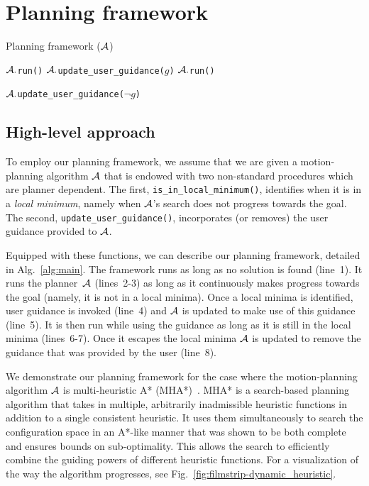 \documentclass[conference]{IEEEtran}
\begin{document}
\section{Planning framework}
\label{sec:planning}
\algrenewcommand\algorithmicindent{.8em}
\begin{algorithm}[tb]
\caption{Planning framework ($\mathcal{A}$)}
\label{alg:main}	
\begin{algorithmic}[1]
\small
{} 
		\State $\mathcal{A}.$\texttt{run()}
	\EndWhile
%	
	\State $\mathcal{A}.$\texttt{update\_user\_guidance($g$)}
		\State $\mathcal{A}.$\texttt{run()}
	\EndWhile

	\State $\mathcal{A}.$\texttt{update\_user\_guidance($\neg g$)}
\EndWhile
\end{algorithmic}
\end{algorithm}

\subsection{High-level approach}
\label{sec:high}
To employ our planning framework, we assume that we are given a motion-planning algorithm $\mathcal{A}$ that is endowed with two non-standard procedures which are planner dependent.
The first, \texttt{is\_in\_local\_minimum()}, 
identifies when it is in a \emph{local minimum}, namely when $\mathcal{A}$'s search does not progress towards the goal. 
The second, \texttt{update\_user\_guidance()}, 
incorporates (or removes) the user guidance provided to $\mathcal{A}$. 

Equipped with these functions, we can describe our planning framework, detailed in Alg.~\ref{alg:main}.
The framework runs as long as no solution is found (line~1).
It runs the planner~$\mathcal{A}$ (lines~2-3) as long as it continuously makes progress towards the goal (namely, it is not in a local minima).
Once a local minima is identified, user guidance is invoked (line~4) and $\mathcal{A}$  is updated to make use of this guidance (line~5).
It is then run while using the guidance as long as it is still in the local minima (lines~6-7).
Once it escapes the local minima $\mathcal{A}$ is updated to remove the guidance that was provided by the user (line~8).


We demonstrate our planning framework for the case where the motion-planning algorithm $\mathcal{A}$ is multi-heuristic A* (MHA*)~\cite{ASNHL16}.
MHA* is a search-based planning algorithm that takes in multiple, arbitrarily inadmissible heuristic functions in addition to a single consistent heuristic.
It uses them simultaneously to search the configuration space in an A*-like manner that was shown to be both complete and ensures bounds on sub-optimality. 
This allows the search to efficiently combine the guiding powers of different heuristic functions. 
For a visualization of the way the algorithm progresses, see Fig.~\ref{fig:filmstrip-dynamic_heuristic}.
\end{document}
